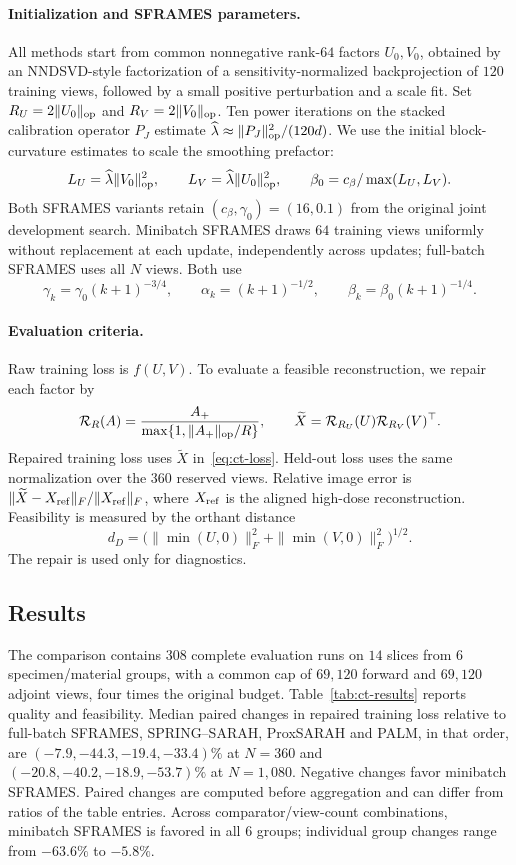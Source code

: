 \paragraph{Initialization and SFRAMES parameters.}
All methods start from common nonnegative rank-\(64\) factors \(U_0,V_0\),
obtained by an NNDSVD-style factorization of a sensitivity-normalized
backprojection of \(120\) training views, followed by a small positive
perturbation and a scale fit. Set \(R_U=2\|U_0\|_{\rm op}\) and
\(R_V=2\|V_0\|_{\rm op}\). Ten power iterations on the stacked calibration
operator \(P_J\) estimate \(\widehat\lambda\approx\|P_J\|_{\rm op}^2/(120d)\).
We use the initial block-curvature estimates to scale the smoothing prefactor:
\[
 L_U=\widehat\lambda\|V_0\|_{\rm op}^2,\qquad
 L_V=\widehat\lambda\|U_0\|_{\rm op}^2,\qquad
 \beta_0=c_\beta/\max(L_U,L_V).
\]
Both SFRAMES variants retain \((c_\beta,\gamma_0)=(16,0.1)\) from the original joint development search.
Minibatch SFRAMES draws \(64\) training views uniformly without replacement
at each update, independently across updates; full-batch SFRAMES uses all
\(N\) views. Both use
\[
 \gamma_k=\gamma_0(k+1)^{-3/4},\qquad
 \alpha_k=(k+1)^{-1/2},\qquad
 \beta_k=\beta_0(k+1)^{-1/4}.
\]

\paragraph{Evaluation criteria.}
Raw training loss is \(f(U,V)\). To evaluate a feasible reconstruction, we
repair each factor by
\[
 \mathcal R_R(A)=\frac{A_+}{\max\{1,\|A_+\|_{\rm op}/R\}},\qquad
 \widetilde X=\mathcal R_{R_U}(U)\mathcal R_{R_V}(V)^\top.
\]
Repaired training loss uses \(\widetilde X\) in~\eqref{eq:ct-loss}.
Held-out loss uses the same normalization over the \(360\) reserved views.
Relative image error is \(\|\widetilde X-X_{\rm ref}\|_F/\|X_{\rm ref}\|_F\),
where \(X_{\rm ref}\) is the aligned high-dose reconstruction. Feasibility
is measured by the orthant distance
\[
 d_D=\bigl(\|\min(U,0)\|_F^2+\|\min(V,0)\|_F^2\bigr)^{1/2}.
\]
The repair is used only for diagnostics.

\subsection{Results}
\label{sec:ct-results}

The comparison contains \(308\) complete evaluation runs on
\(14\) slices from \(6\) specimen/material groups,
with a common cap of \(69{,}120\) forward and \(69{,}120\) adjoint views,
four times the original budget. Table~\ref{tab:ct-results} reports quality and feasibility.
Median paired changes in repaired training loss relative to full-batch SFRAMES,
SPRING--SARAH, ProxSARAH and PALM, in that order, are
\((-7.9,-44.3,-19.4,-33.4)\%\) at \(N=360\) and \((-20.8,-40.2,-18.9,-53.7)\%\) at \(N=1{,}080\). Negative changes favor minibatch SFRAMES.
Paired changes are computed before aggregation and can differ from ratios of the table entries.
Across comparator/view-count combinations, minibatch SFRAMES is favored in
all \(6\) groups;
individual group changes range from \(-63.6\%\) to \(-5.8\%\).

